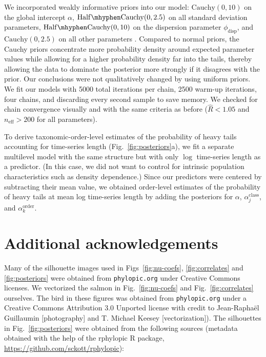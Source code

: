We incorporated weakly informative priors into our model: $\mathrm{Cauchy}(0,
10)$ on the global intercept $\alpha$, $\mathrm{Half\mhyphen Cauchy}(0, 2.5)$
on all standard deviation parameters, $\mathrm{Half\mhyphen Cauchy}(0, 10)$ on
the dispersion parameter $\phi_\mathrm{disp}$, and $\mathrm{Cauchy}(0, 2.5)$
on all other parameters \citep{gelman2006c, gelman2008d}. Compared to normal
priors, the Cauchy priors concentrate more probability density around expected
parameter values while allowing for a higher probability density far into the
tails, thereby allowing the data to dominate the posterior more strongly if it
disagrees with the prior. Our conclusions were not qualitatively changed by
using uniform priors. We fit our models with 5000 total iterations per chain,
2500 warm-up iterations, four chains, and discarding every second sample to
save memory. We checked for chain convergence visually and with the same
criteria as before ($\widehat{R} < 1.05$ and $n_\mathrm{eff} >200$ for all
parameters).

To derive taxonomic-order-level estimates of the probability of heavy tails
accounting for time-series length (Fig.~\ref{fig:posteriors}a), we fit a
separate multilevel model with the same structure but with only $\log$
time-series length as a predictor. (In this case, we did not want to control
for intrinsic population characteristics such as density dependence.) Since
our predictors were centered by subtracting their mean value, we obtained
order-level estimates of the probability of heavy tails at mean log
time-series length by adding the posteriors for $\alpha$,
$\alpha^\mathrm{class}_j$, and $\alpha^\mathrm{order}_k$.

\section{Additional acknowledgements}

Many of the silhouette images used in Figs~\ref{fig:nu-coefs},
\ref{fig:correlates} and \ref{fig:posteriors} were obtained from
\texttt{phylopic.org} under Creative Commons licenses. We vectorized the
salmon in Fig.~\ref{fig:nu-coefs} and Fig.~\ref{fig:correlates} ourselves. The
bird in these figures was obtained from \texttt{phylopic.org} under a Creative
Commons Attribution 3.0 Unported license with credit to Jean-Raphaël
Guillaumin {[}photography{]} and T. Michael Keesey {[}vectorization{]}). The
silhouettes in Fig.~\ref{fig:posteriors} were obtained from the following
sources (metadata obtained with the help of the rphylopic R package,
\url{https://github.com/sckott/rphylopic}):

